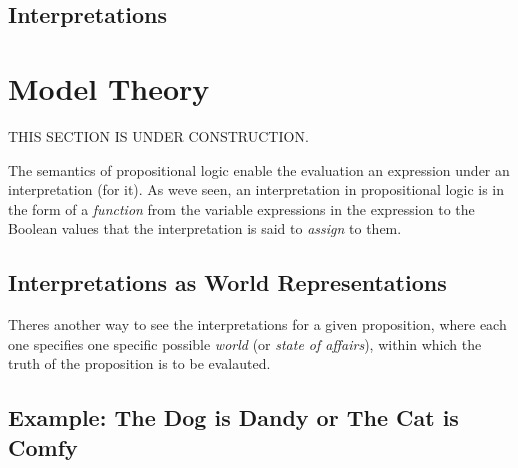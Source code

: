 \documentclass{book}
\begin{document}
\hypertarget{pandoc.profile.debug__pandoc__debug__src__dmt1__lectures__l02_proplogic__formal__interpretation.lean.md}{}
\hypertarget{pandoc.profile.debug__pandoc__debug__src__dmt1__lectures__l02_proplogic__formal__interpretation.lean.md__interpretations}{%
\section{Interpretations}\label{pandoc.profile.debug__pandoc__debug__src__dmt1__lectures__l02_proplogic__formal__interpretation.lean.md__interpretations}}

\hypertarget{pandoc.profile.debug__pandoc__debug__src__modeltheory.md}{}
\hypertarget{pandoc.profile.debug__pandoc__debug__src__modeltheory.md__model-theory}{%
\chapter{Model Theory}\label{pandoc.profile.debug__pandoc__debug__src__modeltheory.md__model-theory}}

THIS SECTION IS UNDER CONSTRUCTION.

The semantics of propositional logic enable the
evaluation an expression under an interpretation
(for it). As we\textquotesingle ve seen, an interpretation in
propositional logic is in the form of a \emph{function}
from the variable expressions in the expression
to the Boolean values that the interpretation is
said to \emph{assign} to them.

\hypertarget{pandoc.profile.debug__pandoc__debug__src__modeltheory.md__interpretations-as-world-representations}{%
\section*{Interpretations as World Representations}\label{pandoc.profile.debug__pandoc__debug__src__modeltheory.md__interpretations-as-world-representations}}

There\textquotesingle s another way to see the interpretations for
a given proposition, where each one specifies one
specific possible \emph{world} (or \emph{state of affairs}),
within which the truth of the proposition is to be evalauted.

\hypertarget{pandoc.profile.debug__pandoc__debug__src__modeltheory.md__example-the-dog-is-dandy-or-the-cat-is-comfy}{%
\section*{Example: The Dog is Dandy or The Cat is Comfy}\label{pandoc.profile.debug__pandoc__debug__src__modeltheory.md__example-the-dog-is-dandy-or-the-cat-is-comfy}}
\end{document}
